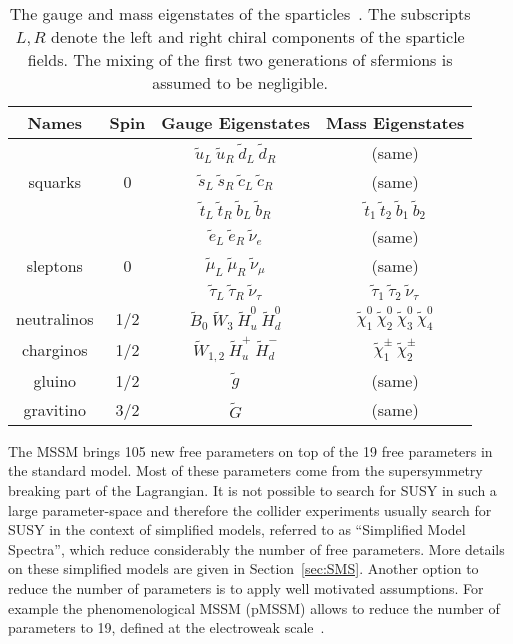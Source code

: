 \begin{table}[h]
\begin{center}
\begin{tabular}{|c|c|c|c|}
\hline
Names & Spin  & Gauge Eigenstates & Mass Eigenstates  \\
\hline
      \rule{0pt}{3ex}   &   & $\tilde{u}_{L}~\tilde{u}_{R}~\tilde{d}_{L}~\tilde{d}_{R}$  & (same) \\
squarks & 0 & $\tilde{s}_{L}~\tilde{s}_{R}~\tilde{c}_{L}~\tilde{c}_{R}$  & (same) \\
        &   & $\tilde{t}_{L}~\tilde{t}_{R}~\tilde{b}_{L}~\tilde{b}_{R}$  & $\tilde{t}_{1}~\tilde{t}_{2}~\tilde{b}_{1}~\tilde{b}_{2}$ \\
\hline
         &   & $\tilde{e}_{L}~\tilde{e}_{R}~\tilde{\nu}_{e}$  & (same) \\
sleptons & 0 & $\tilde{\mu}_{L}~\tilde{\mu}_{R}~\tilde{\nu}_{\mu}$  & (same) \\
         &   & $\tilde{\tau}_{L}~\tilde{\tau}_{R}~\tilde{\nu}_{\tau}$  & $\tilde{\tau}_{1}~\tilde{\tau}_{2}~\tilde{\nu}_{\tau}$ \\
\hline
neutralinos \rule{0pt}{3ex} & 1/2 & $\tilde{B}_{0}~\tilde{W}_{3}~\tilde{H}_{u}^{0}~\tilde{H}_{d}^{0}$  & $\tilde{\chi}_{1}^{0}~\tilde{\chi}_{2}^{0}~\tilde{\chi}_{3}^{0}~\tilde{\chi}_{4}^{0} $ \\
\hline
charginos  \rule{0pt}{3ex} & 1/2 & $\tilde{W}_{1,2}~\tilde{H}_{u}^{+}~\tilde{H}_{d}^{-}$  & $\tilde{\chi}_{1}^{\pm}~\tilde{\chi}_{2}^{\pm} $ \\
\hline 
gluino & 1/2 & $\tilde{g}$  & (same) \\
\hline
gravitino  \rule{0pt}{3ex} & 3/2 & $\tilde{G}$  & (same) \\
\hline
\end{tabular}
\caption[Table caption text]{The gauge and mass eigenstates of the sparticles~\cite{Martin:1997ns}. The subscripts $L,R$ denote the left and right chiral components of the sparticle fields. The mixing of the first two generations of sfermions is assumed to be negligible. }
\label{tab:SUSYspectrum}
\end{center}
\end{table}

The MSSM brings 105 new free parameters on top of the 19 free parameters in the standard model. Most of these parameters come from the supersymmetry breaking part of the Lagrangian. It is not possible to search for SUSY in such a large parameter-space and therefore the collider experiments usually search for SUSY in the context of simplified models, referred to as ``Simplified Model Spectra'', which reduce considerably the number of free parameters. More details on these simplified models are given in Section~\ref{sec:SMS}. Another option to reduce the number of parameters is to apply well motivated assumptions. For example the phenomenological MSSM  (pMSSM) allows to reduce the number of parameters to 19, defined at the electroweak scale~\cite{Berger:2008cq}.

